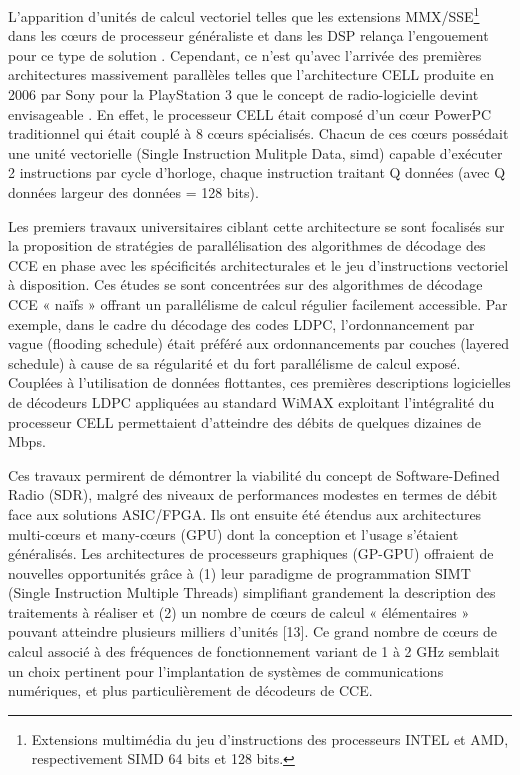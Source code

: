 \documentclass[../main.tex]{subfiles}
\begin{document}
L’apparition d’unités de calcul vectoriel telles que les extensions MMX/SSE\footnote{Extensions multimédia du jeu d’instructions des processeurs INTEL et AMD, respectivement SIMD 64 bits et 128 bits.} dans les cœurs de processeur généraliste et dans les DSP relança l’engouement pour ce type de solution \cite{turbo:mmx,viterbi:sse,viterbi:mmx}. Cependant, ce n’est qu’avec l'arrivée des premières architectures massivement parallèles telles que l'architecture CELL \cite{CELL} produite en 2006 par Sony pour la PlayStation 3 que le concept de radio-logicielle devint envisageable  \cite{CELL:LDPC1,CELL:LDPC2,CELL:TURBO}. En effet, le processeur CELL était composé d’un cœur PowerPC traditionnel qui était couplé à 8 cœurs spécialisés. Chacun de ces cœurs possédait une unité vectorielle (Single Instruction Mulitple Data, \acrshort{simd}) capable d’exécuter 2 instructions par cycle d’horloge, chaque instruction traitant Q données (avec Q données \times  largeur des données = 128 bits).



Les premiers travaux universitaires ciblant cette architecture  \cite{CELL:LDPC1,CELL:LDPC2,CELL:TURBO} se sont focalisés sur la proposition de stratégies de parallélisation des algorithmes de décodage des CCE en phase avec les spécificités architecturales et le jeu d’instructions vectoriel à disposition. Ces études se sont concentrées sur des algorithmes de décodage CCE « naïfs » offrant un parallélisme de calcul régulier facilement accessible. Par exemple, dans le cadre du décodage des codes LDPC, l’ordonnancement par vague (flooding schedule) était préféré aux ordonnancements par couches (layered schedule) à cause de sa régularité et du fort parallélisme de calcul exposé. Couplées à l’utilisation de données flottantes, ces premières descriptions logicielles de décodeurs LDPC appliquées au standard WiMAX exploitant l’intégralité du processeur CELL permettaient d’atteindre des débits de quelques dizaines de Mbps. 



Ces travaux permirent de démontrer la viabilité du concept de Software-Defined Radio (SDR), malgré des niveaux de performances modestes en termes de débit face aux solutions ASIC/FPGA. Ils ont ensuite été étendus aux architectures multi-cœurs et many-cœurs (GPU) dont la conception et l’usage s'étaient généralisés. Les architectures de processeurs graphiques (GP-GPU) offraient de nouvelles opportunités grâce à (1) leur paradigme de programmation SIMT (Single Instruction Multiple Threads) simplifiant grandement la description des traitements à réaliser et (2) un nombre de cœurs de calcul « élémentaires » pouvant atteindre plusieurs milliers d’unités \cite{14}[13]. Ce grand nombre de cœurs de calcul associé à des fréquences de fonctionnement variant de 1 à 2 GHz semblait un choix pertinent pour l’implantation de systèmes de communications numériques, et plus particulièrement de décodeurs de CCE.
\end{document}
